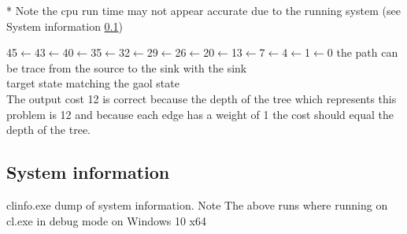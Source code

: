 \documentclass[12pt]{article}
\begin{document}
* Note the cpu run time may not appear accurate due to the running system (see System information \ref{sysinfo})


45$\leftarrow$43$\leftarrow$40$\leftarrow$35$\leftarrow$32$\leftarrow$29$\leftarrow$26$\leftarrow$20$\leftarrow$13$\leftarrow$7$\leftarrow$4$\leftarrow$1$\leftarrow$0
the path can be trace from the source to the sink with the sink\\target state matching the gaol state
\\
The output cost 12 is correct because the depth of the tree which represents
this problem is 12 and because each edge has a weight of 1 the cost should equal the depth of the tree.

\subsection{System information}\label{sysinfo}
clinfo.exe dump of system information. 
Note The above runs where running on cl.exe in debug mode on Windows 10 x64
\end{document}
